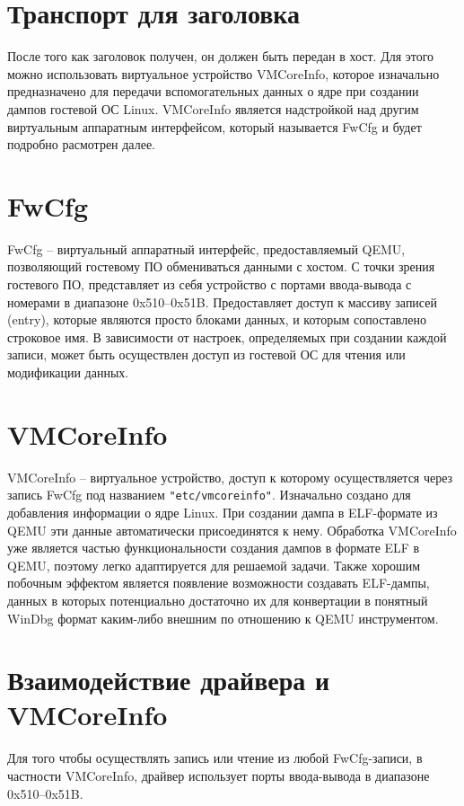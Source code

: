 \documentclass{mipt-thesis-bs}
\begin{document}
\section*{Транспорт для заголовка}

После того как заголовок получен, он должен быть передан в хост. Для этого можно использовать виртуальное устройство VMCoreInfo, которое изначально предназначено для передачи вспомогательных данных о ядре при создании дампов гостевой ОС Linux. VMCoreInfo является надстройкой над другим виртуальным аппаратным интерфейсом, который называется FwCfg и будет подробно расмотрен далее.

\section*{FwCfg}

FwCfg -- виртуальный аппаратный интерфейс, предоставляемый QEMU, позволяющий гостевому ПО обмениваться данными с хостом. С точки зрения гостевого ПО, представляет из себя устройство с портами ввода-вывода с номерами в диапазоне 0x510--0x51B. Предоставляет доступ к массиву записей (entry), которые являются просто блоками данных, и которым сопоставлено строковое имя. В зависимости от настроек, определяемых при создании каждой записи, может быть осуществлен доступ из гостевой ОС для чтения или модификации данных.

\section*{VMCoreInfo}

VMCoreInfo -- виртуальное устройство, доступ к которому осуществляется через запись FwCfg под названием \texttt{"etc/vmcoreinfo"}. Изначально создано для добавления информации о ядре Linux. При создании дампа в ELF-формате из QEMU эти данные автоматически присоединятся к нему. Обработка VMCoreInfo уже является частью функциональности создания дампов в формате ELF в QEMU, поэтому легко адаптируется для решаемой задачи. Также хорошим побочным эффектом является появление возможности создавать ELF-дампы, данных в которых потенциально достаточно их для конвертации в понятный WinDbg формат каким-либо внешним по отношению к QEMU инструментом.

\section*{Взаимодействие драйвера и VMCoreInfo}

Для того чтобы осуществлять запись или чтение из любой FwCfg-записи, в частности VMCoreInfo, драйвер использует порты ввода-вывода в диапазоне 0x510--0x51B.
\end{document}
